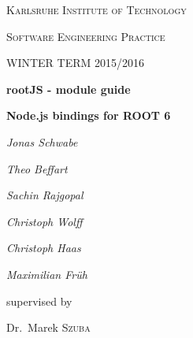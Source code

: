 \begin{titlepage}
	\centering
	{\scshape\LARGE Karlsruhe Institute of Technology \par}
	\vspace{1cm}
	{\scshape\Large Software Engineering Practice\par}
	\vspace{0.5cm}
	{\scshape\Large WINTER TERM 2015/2016\par}
	\vspace{1.5cm}
	{\Huge\bfseries rootJS - module guide\par}
	\vspace{0.25cm}
	{\Large\bfseries Node.js bindings for ROOT 6\par}
	\vspace{2cm}
	{\Large\itshape Jonas Schwabe\par}
	{\Large\itshape Theo Beffart\par}
	{\Large\itshape Sachin Rajgopal\par}
	{\Large\itshape Christoph Wolff\par}
	{\Large\itshape Christoph Haas\par}

	{\Large\itshape Maximilian Fr\"uh\par}
	\vfill
	supervised by\par
	Dr.~Marek \textsc{Szuba}

	\vfill

	{\large \date{99.99.9999}\par}
\end{titlepage}
